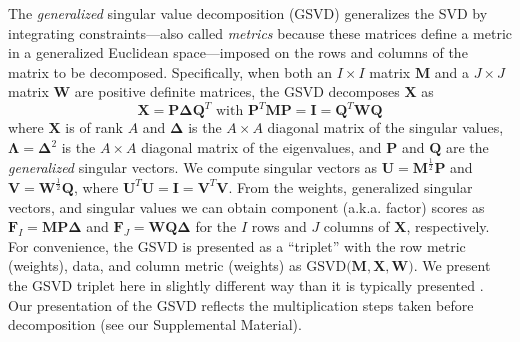 \documentclass[12pt]{article}
\begin{document}
The \emph{generalized} singular value decomposition (GSVD) generalizes
the SVD by integrating constraints---also called \emph{metrics} because
these matrices define a metric in a generalized Euclidean
space---imposed on the rows and columns of the matrix to be decomposed.
Specifically, when both an \(I\times I\) matrix \({\mathbf M}\) and a
\(J\times J\) matrix \({\mathbf W}\) are positive definite matrices, the
GSVD decomposes \({\mathbf X}\) as \begin{equation}\label{eq:gsvd}
{\mathbf X} = {\mathbf P}{\boldsymbol \Delta} {\mathbf Q}^{T} 
\textrm{ with }
{\mathbf P}^{T}{\mathbf M}{\mathbf P} = {\mathbf I} = {\mathbf Q}^{T}{\mathbf W}{\mathbf Q}
\end{equation} where \({\mathbf X}\) is of rank \(A\) and
\({\boldsymbol \Delta}\) is the \(A \times A\) diagonal matrix of the
singular values, \({\boldsymbol \Lambda} = {\boldsymbol \Delta}^2\) is
the \(A \times A\) diagonal matrix of the eigenvalues, and
\({\mathbf P}\) and \({\mathbf Q}\) are the \emph{generalized} singular
vectors. We compute singular vectors as
\({\mathbf U} = {\mathbf M}^{\frac{1}{2}}{\mathbf P}\) and
\({\mathbf V} = {\mathbf W}^{\frac{1}{2}}{\mathbf Q}\), where
\({\mathbf U}^{T}{\mathbf U} = {\mathbf I} = {\mathbf V}^{T}{\mathbf V}\).
From the weights, generalized singular vectors, and singular values we
can obtain component (a.k.a. factor) scores as
\({\mathbf F}_{I} = {\mathbf M}{\mathbf P}{\boldsymbol \Delta}\) and
\({\mathbf F}_{J} = {\mathbf W}{\mathbf Q}{\boldsymbol \Delta}\) for the
\(I\) rows and \(J\) columns of \({\mathbf X}\), respectively. For
convenience, the GSVD is presented as a ``triplet'' with the row metric
(weights), data, and column metric (weights) as
\(\mathrm{GSVD(}{\mathbf M}, {\mathbf X}, {\mathbf W}\mathrm{)}\). We
present the GSVD triplet here in slightly different way than it is
typically presented \citep[see, e.g.,][]{holmes2008multivariate}. Our
presentation of the GSVD reflects the multiplication steps taken before
decomposition (see our Supplemental Material).
\end{document}
